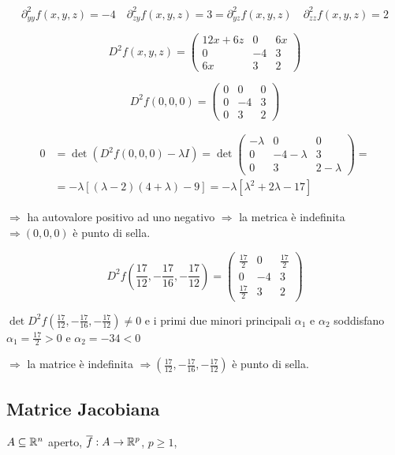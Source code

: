 \begin{exbar}
\begin{example}
	$$\partial_{yy}^2f(x,y,z)=-4 \quad \partial_{zy}^2f(x,y,z)=3=\partial_{yz}^2f(x,y,z) \quad \partial_{zz}^2f(x,y,z)=2$$
	
	$$D^2f(x,y,z)=\begin{pmatrix}
		12x+6z&0&6x\\
		0&-4&3\\
		6x&3&2
	\end{pmatrix}$$
	
	$$D^2f(0,0,0)=\begin{pmatrix}
		0&0&0\\
		0&-4&3\\
		0&3&2
	\end{pmatrix}$$
	
	\begin{align*} 
		0
		&=\det(D^2f(0,0,0)-\lambda I)
		= \det \begin{pmatrix}
			-\lambda&0&0\\
			0&-4-\lambda&3\\
			0&3&2-\lambda
		\end{pmatrix}=
		\\
		&=-\lambda[(\lambda-2)(4+\lambda)-9]=-\lambda[\lambda^2+2\lambda-17]
	\end{align*}
	
	$ \Rightarrow$ ha autovalore positivo ad uno negativo $\Rightarrow$ la metrica è indefinita $\Rightarrow (0,0,0)$ è punto di sella.
	
	$$D^2f(\frac{17}{12},-\frac{17}{16},-\frac{17}{12})=\begin{pmatrix}
		\frac{17}{2}&0&\frac{17}{2}\\
		0&-4&3\\
		\frac{17}{2}&3&2
	\end{pmatrix}$$
	
	$\det D^2f(\frac{17}{12},-\frac{17}{16},-\frac{17}{12})\neq 0$ e i primi due minori principali $\alpha_1$ e $\alpha_2$ soddisfano $\alpha_1= \frac{17}{2} >0$ e $\alpha_2 =-34 <0$
	
	$\Rightarrow$ la matrice è indefinita $\Rightarrow (\frac{17}{12},-\frac{17}{16},-\frac{17}{12})$ è punto di sella.
\end{example}
\end{exbar}


\subsection{Matrice Jacobiana}

$A \subseteq \mathbb{R}^n$ aperto, $\overline{f}: A \rightarrow \mathbb{R}^p$, $p \geq 1$, 

